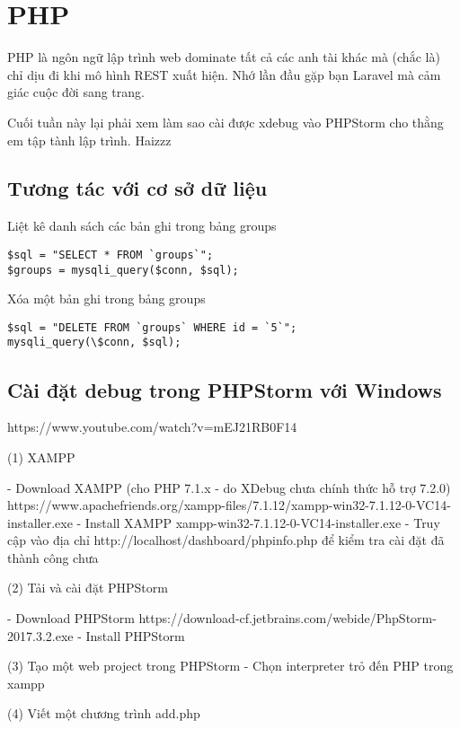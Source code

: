 \chapter{PHP}

PHP là ngôn ngữ lập trình web dominate tất cả các anh tài khác mà (chắc là) chỉ dịu đi khi mô hình REST xuất hiện. Nhớ lần đầu gặp bạn Laravel mà cảm giác cuộc đời sang trang.

Cuối tuần này lại phải xem làm sao cài được xdebug vào PHPStorm cho thằng em tập tành lập trình. Haizzz

\section{Tương tác với cơ sở dữ liệu}

Liệt kê danh sách các bản ghi trong bảng groups

\begin{lstlisting}
$sql = "SELECT * FROM `groups`";
$groups = mysqli_query($conn, $sql);
\end{lstlisting}


Xóa một bản ghi trong bảng groups

\begin{lstlisting}
$sql = "DELETE FROM `groups` WHERE id = `5`";
mysqli_query(\$conn, $sql);
\end{lstlisting}


\section{Cài đặt debug trong PHPStorm với Windows} 

https://www.youtube.com/watch?v=mEJ21RB0F14

(1) XAMPP

- Download XAMPP (cho PHP 7.1.x - do XDebug chưa chính thức hỗ trợ 7.2.0)
https://www.apachefriends.org/xampp-files/7.1.12/xampp-win32-7.1.12-0-VC14-installer.exe
- Install XAMPP xampp-win32-7.1.12-0-VC14-installer.exe
- Truy cập vào địa chỉ http://localhost/dashboard/phpinfo.php để kiểm tra cài đặt đã thành công chưa

(2) Tải và cài đặt PHPStorm

- Download PHPStorm https://download-cf.jetbrains.com/webide/PhpStorm-2017.3.2.exe
- Install PHPStorm

(3) Tạo một web project trong PHPStorm
- Chọn interpreter trỏ đến PHP trong xampp

(4) Viết một chương trình add.php

